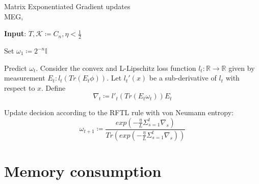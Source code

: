 \documentclass[%
 reprint,
 amsmath,amssymb,
 aps,
]{revtex4-2}
\begin{document}
\begin{algorithm}
\caption{Matrix Exponentiated Gradient updates\\ MEG,~\cite{meg}}
\hspace*{\algorithmicindent} \textbf{Input}: $T,\mathcal{K}\coloneqq C_n,\eta < \frac{1}{2}$ \\
\begin{algorithmic}[1]
\State Set $\omega_1\coloneqq 2^{-n}\mathbb{I}$

    \State  Predict $\omega_t$. Consider the convex and L-Lipschitz loss function $l_t : \mathbb{R} \rightarrow \mathbb{R}$ given by measurement $E_t : l_t(Tr(E_t\phi))$. Let $l_t'(x)$ be a sub-derivative of $l_t$ with respect to $x$. Define
    $$\nabla_t\coloneqq l'_t(Tr(E_t\omega_t))E_t$$

\State Update decision according to the RFTL rule with von Neumann entropy:
\begin{equation}
\label{eq:meg}
\omega_{t+1}\coloneqq\frac{exp(-\frac{\eta}{L}\Sigma_{s=1}^t\nabla_s)}{Tr(exp(-\frac{\eta}{L}\Sigma_{s=1}^t\nabla_s))}    
\end{equation}

\EndFor

\end{algorithmic}
\label{algo:meg}
\end{algorithm}

\section{Memory consumption}\label{sec:app_memory}
\end{document}
